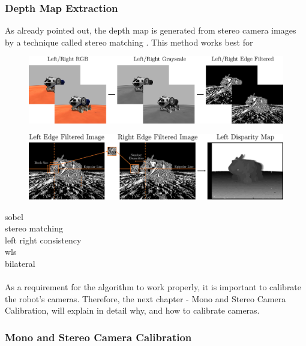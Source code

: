 \subsubsection{Depth Map Extraction}
As already pointed out, the depth map is generated from stereo camera images by a technique called stereo matching \cite{hamzah2010sum}. This method works best for  
\begin{figure}[h]
	\centering
	\includegraphics[scale=.25]{chapters/03_background/img/image_preprocessing.png}
	\caption{}
	\label{fig::323_image_preprocessing}
\end{figure}
\begin{figure}[h]
	\centering
	\includegraphics[scale=.3]{chapters/03_background/img/left_disparity_map.png}
	\caption{}
	\label{fig::323_left_disparity_map}
\end{figure}
\cite{sobel2014an}   sobel\\
\cite{hamzah2010sum} stereo matching\\
\cite{egnal2004stereo} left right consistency\\
\cite{min2014fast}   wls\\
\cite{tomasi1998bilateral} bilateral
\\\\
As a requirement for the algorithm to work properly, it is important to calibrate the robot's cameras. Therefore, the next chapter - Mono and Stereo Camera Calibration, will explain in detail why, and how to calibrate cameras.
\subsubsection{Mono and Stereo Camera Calibration}